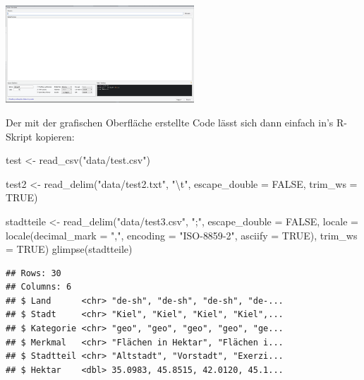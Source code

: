 \documentclass[
]{book}
\newenvironment{Shaded}{\begin{snugshade}}{\end{snugshade}}
\newcommand{\AttributeTok}[1]{\textcolor[rgb]{0.77,0.63,0.00}{#1}}
\newcommand{\ConstantTok}[1]{\textcolor[rgb]{0.00,0.00,0.00}{#1}}
\newcommand{\FunctionTok}[1]{\textcolor[rgb]{0.00,0.00,0.00}{#1}}
\newcommand{\NormalTok}[1]{#1}
\newcommand{\OtherTok}[1]{\textcolor[rgb]{0.56,0.35,0.01}{#1}}
\newcommand{\SpecialCharTok}[1]{\textcolor[rgb]{0.00,0.00,0.00}{#1}}
\newcommand{\StringTok}[1]{\textcolor[rgb]{0.31,0.60,0.02}{#1}}
\begin{document}
\begin{center}\includegraphics[width=200pt]{imgs/read_txt} \end{center}

Der mit der grafischen Oberfläche erstellte Code lässt sich dann einfach in's R-Skript kopieren:

\begin{Shaded}
\begin{Highlighting}[]
\NormalTok{test }\OtherTok{\textless{}{-}} \FunctionTok{read\_csv}\NormalTok{(}\StringTok{"data/test.csv"}\NormalTok{)}

\NormalTok{test2 }\OtherTok{\textless{}{-}} \FunctionTok{read\_delim}\NormalTok{(}\StringTok{"data/test2.txt"}\NormalTok{, }
                    \StringTok{"}\SpecialCharTok{\textbackslash{}t}\StringTok{"}\NormalTok{,}
                    \AttributeTok{escape\_double =} \ConstantTok{FALSE}\NormalTok{, }
                    \AttributeTok{trim\_ws =} \ConstantTok{TRUE}\NormalTok{)}

\NormalTok{stadtteile }\OtherTok{\textless{}{-}} \FunctionTok{read\_delim}\NormalTok{(}\StringTok{"data/test3.csv"}\NormalTok{, }
                    \StringTok{";"}\NormalTok{, }
                    \AttributeTok{escape\_double =} \ConstantTok{FALSE}\NormalTok{, }
                    \AttributeTok{locale =} \FunctionTok{locale}\NormalTok{(}\AttributeTok{decimal\_mark =} \StringTok{","}\NormalTok{, }
                                    \AttributeTok{encoding =} \StringTok{"ISO{-}8859{-}2"}\NormalTok{, }
                                    \AttributeTok{asciify =} \ConstantTok{TRUE}\NormalTok{), }
                    \AttributeTok{trim\_ws =} \ConstantTok{TRUE}\NormalTok{)}
\FunctionTok{glimpse}\NormalTok{(stadtteile)}
\end{Highlighting}
\end{Shaded}

\begin{verbatim}
## Rows: 30
## Columns: 6
## $ Land      <chr> "de-sh", "de-sh", "de-sh", "de-...
## $ Stadt     <chr> "Kiel", "Kiel", "Kiel", "Kiel",...
## $ Kategorie <chr> "geo", "geo", "geo", "geo", "ge...
## $ Merkmal   <chr> "Flächen in Hektar", "Flächen i...
## $ Stadtteil <chr> "Altstadt", "Vorstadt", "Exerzi...
## $ Hektar    <dbl> 35.0983, 45.8515, 42.0120, 45.1...
\end{verbatim}
\end{document}

